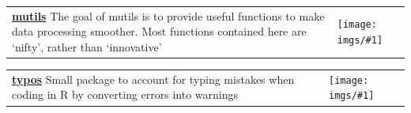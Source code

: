 \documentclass[11pt]{article}
\newcommand{\blue}[1]{\textcolor{MyBlue1}{#1}}
\begin{document}
\newcommand{\Rpackage}[3]{
\begin{tabularx}{\textwidth}{Zm{2.2cm}}
\href{#2}{\textbf{\blue{#1}}} #3 &
\texttt{[image: imgs/\#1]} 
\end{tabularx}
}


\Rpackage{mutils}{https://michaelbarrowman.co.uk/mutils/}{The goal of mutils is to provide useful functions to make data processing smoother. Most functions contained here are `nifty', rather than `innovative'}


\Rpackage{typos}{https://michaelbarrowman.co.uk/typos/}{Small package to account for typing mistakes when coding in R by converting errors into warnings}
\end{document}
